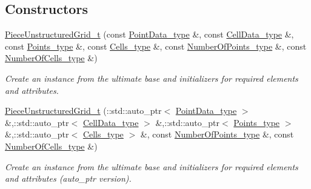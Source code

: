 \subsection*{Constructors}
\begin{DoxyCompactItemize}
\item 
\hyperlink{classPieceUnstructuredGrid__t_a9d30b76eb9efa7565011da966d5c0df7}{Piece\+Unstructured\+Grid\+\_\+t} (const \hyperlink{classPieceUnstructuredGrid__t_a5d79d8ea03ca53f80f24e62c2175ec02}{Point\+Data\+\_\+type} \&, const \hyperlink{classPieceUnstructuredGrid__t_a4232a7b88477ee6f692a4e5fab6a65d1}{Cell\+Data\+\_\+type} \&, const \hyperlink{classPieceUnstructuredGrid__t_a7747b159a3d1eee8d02a0eefaa235711}{Points\+\_\+type} \&, const \hyperlink{classPieceUnstructuredGrid__t_aca1ec38eff08bde0cd115c54dbb7a20f}{Cells\+\_\+type} \&, const \hyperlink{classPieceUnstructuredGrid__t_a8df1cd0d138d990e166d325ceed9a660}{Number\+Of\+Points\+\_\+type} \&, const \hyperlink{classPieceUnstructuredGrid__t_aeae5546900c50a4abe9b3aea485e97d0}{Number\+Of\+Cells\+\_\+type} \&)
\begin{DoxyCompactList}\small\item\em Create an instance from the ultimate base and initializers for required elements and attributes. \end{DoxyCompactList}\item 
\hyperlink{classPieceUnstructuredGrid__t_a2b90af1916dfe3153cb1d630af5af490}{Piece\+Unstructured\+Grid\+\_\+t} (\+::std\+::auto\+\_\+ptr$<$ \hyperlink{classPieceUnstructuredGrid__t_a5d79d8ea03ca53f80f24e62c2175ec02}{Point\+Data\+\_\+type} $>$ \&,\+::std\+::auto\+\_\+ptr$<$ \hyperlink{classPieceUnstructuredGrid__t_a4232a7b88477ee6f692a4e5fab6a65d1}{Cell\+Data\+\_\+type} $>$ \&,\+::std\+::auto\+\_\+ptr$<$ \hyperlink{classPieceUnstructuredGrid__t_a7747b159a3d1eee8d02a0eefaa235711}{Points\+\_\+type} $>$ \&,\+::std\+::auto\+\_\+ptr$<$ \hyperlink{classPieceUnstructuredGrid__t_aca1ec38eff08bde0cd115c54dbb7a20f}{Cells\+\_\+type} $>$ \&, const \hyperlink{classPieceUnstructuredGrid__t_a8df1cd0d138d990e166d325ceed9a660}{Number\+Of\+Points\+\_\+type} \&, const \hyperlink{classPieceUnstructuredGrid__t_aeae5546900c50a4abe9b3aea485e97d0}{Number\+Of\+Cells\+\_\+type} \&)
\begin{DoxyCompactList}\small\item\em Create an instance from the ultimate base and initializers for required elements and attributes (auto\+\_\+ptr version). \end{DoxyCompactList}\item 

\end{DoxyCompactItemize}
